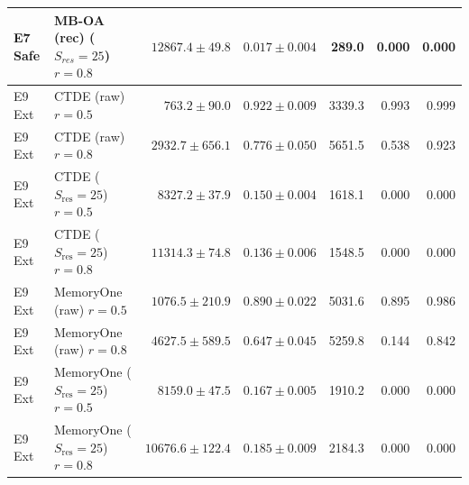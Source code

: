 \begin{tabular}{llrrrrr}
E7 Safe & MB-OA (rec) ($S_{res}=25$) $r=0.8$ & $12867.4 \pm 49.8$ & $0.017 \pm 0.004$ & 289.0 & 0.000 & 0.000 \\
\midrule
E9 Ext & CTDE (raw) $r=0.5$ & $763.2 \pm 90.0$ & $0.922 \pm 0.009$ & 3339.3 & 0.993 & 0.999 \\
E9 Ext & CTDE (raw) $r=0.8$ & $2932.7 \pm 656.1$ & $0.776 \pm 0.050$ & 5651.5 & 0.538 & 0.923 \\
E9 Ext & CTDE ($S_{\text{res}}=25$) $r=0.5$ & $8327.2 \pm 37.9$ & $0.150 \pm 0.004$ & 1618.1 & 0.000 & 0.000 \\
E9 Ext & CTDE ($S_{\text{res}}=25$) $r=0.8$ & $11314.3 \pm 74.8$ & $0.136 \pm 0.006$ & 1548.5 & 0.000 & 0.000 \\
E9 Ext & MemoryOne (raw) $r=0.5$ & $1076.5 \pm 210.9$ & $0.890 \pm 0.022$ & 5031.6 & 0.895 & 0.986 \\
E9 Ext & MemoryOne (raw) $r=0.8$ & $4627.5 \pm 589.5$ & $0.647 \pm 0.045$ & 5259.8 & 0.144 & 0.842 \\
E9 Ext & MemoryOne ($S_{\text{res}}=25$) $r=0.5$ & $8159.0 \pm 47.5$ & $0.167 \pm 0.005$ & 1910.2 & 0.000 & 0.000 \\
E9 Ext & MemoryOne ($S_{\text{res}}=25$) $r=0.8$ & $10676.6 \pm 122.4$ & $0.185 \pm 0.009$ & 2184.3 & 0.000 & 0.000 \\
\bottomrule
\end{tabular}
